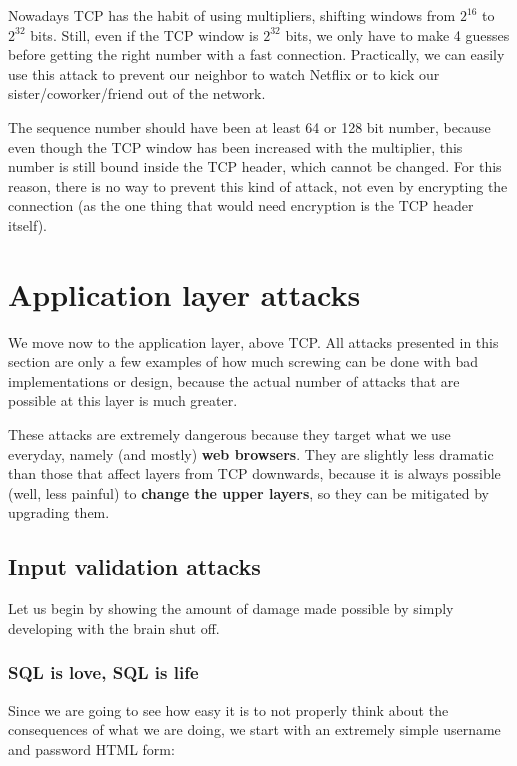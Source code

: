 Nowadays TCP has the habit of using multipliers, shifting windows from $2^{16}$ to $2^{32}$ bits. Still, even if the TCP window is $2^{32}$ bits, we only have to make 4 guesses before getting the right number with a fast connection. Practically, we can easily use this attack to prevent our neighbor to watch Netflix or to kick our sister/coworker/friend out of the network.

The sequence number should have been at least 64 or 128 bit number, because even though the TCP window has been increased with the multiplier, this number is still bound inside the TCP header, which cannot be changed. For this reason, there is no way to prevent this kind of attack, not even by encrypting the connection (as the one thing that would need encryption is the TCP header itself).

\section{Application layer attacks}
We move now to the application layer, above TCP. All attacks presented in this section are only a few examples of how much screwing can be done with bad implementations or design, because the actual number of attacks that are possible at this layer is much greater.
 
These attacks are extremely dangerous because they target what we use everyday, namely (and mostly) \textbf{web browsers}. They are slightly less dramatic than those that affect layers from TCP downwards, because it is always possible (well, less painful) to \textbf{change the upper layers}, so they can be mitigated by upgrading them.

\subsection{Input validation attacks}
Let us begin by showing the amount of damage made possible by simply developing with the brain shut off.

\subsubsection{SQL is love, SQL is life}
Since we are going to see how easy it is to not properly think about the consequences of what we are doing, we start with an extremely simple username and password HTML form:

